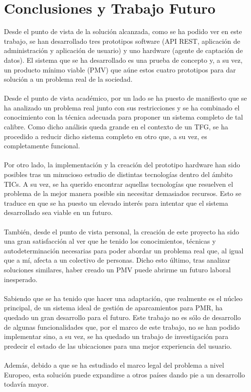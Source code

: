 \chapter{Conclusiones y Trabajo Futuro}
Desde el punto de vista de la solución alcanzada, como se ha podido ver en este trabajo, se han desarrollado tres prototipos software (API REST, aplicación de administración y aplicación de usuario) y uno hardware (agente de captación de datos). El sistema que se ha desarrollado es una prueba de concepto y, a su vez, un producto mínimo viable (PMV) que aúne estos cuatro prototipos para dar solución a un problema real de la sociedad.
\\\\
Desde el punto de vista académico, por un lado se ha puesto de manifiesto que se ha analizado un problema real junto con sus restricciones y se ha combinado el conocimiento con la técnica adecuada para proponer un sistema completo de tal calibre. Como dicho análisis queda grande en el contexto de un TFG, se ha procedido a reducir dicho sistema completo en otro que, a su vez, es completamente funcional.
\\\\
Por otro lado, la implementación y la creación del prototipo hardware han sido posibles tras un minucioso estudio de distintas tecnologías dentro del ámbito TICs. A su vez, se ha querido encontrar aquellas tecnologías que resuelven el problema de la mejor manera posible sin necesitar demasiados recursos. Esto se traduce en que se ha puesto un elevado interés para intentar que el sistema desarrollado sea viable en un futuro.
\\\\
También, desde el punto de vista personal, la creación de este proyecto ha sido una gran satisfacción al ver que he tenido los conocimientos, técnicas y autodeterminación necesarias para poder abordar un problema real que, al igual que a mí, afecta a un colectivo de personas. Dicho esto último, tras analizar soluciones similares, haber creado un PMV puede abrirme un futuro laboral inesperado.
\\\\
Sabiendo que se ha tenido que hacer una adaptación, que realmente es el núcleo principal, de un sistema ideal de gestión de aparcamientos para PMR, ha quedado un gran desarrollo para el futuro. Este trabajo no es sólo de desarrollo de algunas funcionalidades que, por el marco de este trabajo, no se han podido implementar sino, a su vez, se ha quedado un trabajo de investigación para predecir el estado de las ubicaciones para una mejor experiencia del usuario.
\\\\
Además, debido a que se ha estudiado el marco legal del problema a nivel Europeo, esta solución puede expandirse a otros países dando pie a un desarrollo todavía mayor.
